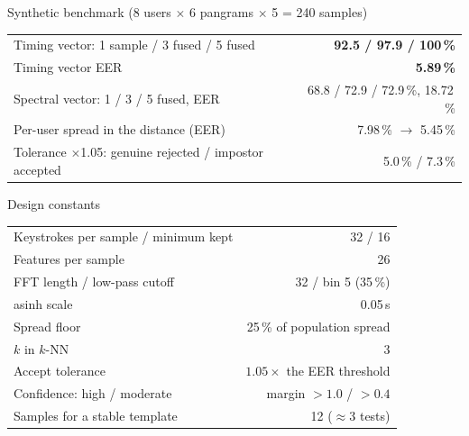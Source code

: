 \documentclass[11pt,a4paper]{article}
\begin{document}
\begin{keybox}{Synthetic benchmark (8 users $\times$ 6 pangrams $\times$ 5 = 240 samples)}
\begin{tabularx}{\linewidth}{@{}X r@{}}
Timing vector: 1 sample / 3 fused / 5 fused      & \textbf{92.5 / 97.9 / 100\,\%} \\
Timing vector EER                                & \textbf{5.89\,\%} \\
Spectral vector: 1 / 3 / 5 fused, EER            & 68.8 / 72.9 / 72.9\,\%, 18.72\,\% \\
Per-user spread in the distance (EER)            & 7.98\,\% $\rightarrow$ 5.45\,\% \\
Tolerance $\times$1.05: genuine rejected / impostor accepted & 5.0\,\% / 7.3\,\% \\
\end{tabularx}
\end{keybox}

\begin{keybox}{Design constants}
\begin{tabularx}{\linewidth}{@{}X r@{}}
Keystrokes per sample / minimum kept             & 32 / 16 \\
Features per sample                              & 26 \\
FFT length / low-pass cutoff                     & 32 / bin 5 (35\,\%) \\
asinh scale                                      & 0.05\,s \\
Spread floor                                     & 25\,\% of population spread \\
$k$ in $k$-NN                                    & 3 \\
Accept tolerance                                 & $1.05\times$ the EER threshold \\
Confidence: high / moderate                      & margin $>1.0$ / $>0.4$ \\
Samples for a stable template                    & 12 ($\approx$3 tests) \\
\end{tabularx}
\end{keybox}
\end{document}
